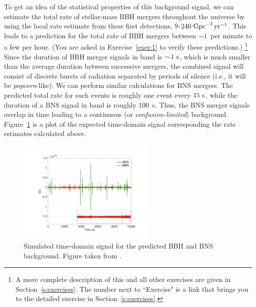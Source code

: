 To get an idea of the statistical properties of this
background signal, we can estimate the total rate of 
stellar-mass BBH mergers throughout the universe by
using the local rate estimate from these first detections,
$9$-$240~{\rm Gpc}^{-3}\,{\rm yr}^{-1}$.
This leads to a prediction for the total rate of 
BBH mergers between $\sim\!1$~per minute to a few per hour.
(You are asked in Exercise~\ref{exer:1} to verify
these predictions.)%
\footnote{A more complete description of this and 
all other exercises are given in 
Section~\ref{s:exercises}.
The number next to ``Exercise" is a link that brings 
you to the detailed exercise in Section~\ref{s:exercises}.}
Since the duration of BBH merger signals in band 
is $\sim\!1~{\rm s}$, which is much smaller than the 
average duration between successive mergers, the 
combined signal will consist of discrete bursts of 
radiation separated by periods of silence 
(i.e., it will be {\em popcorn}-like).
We can perform similar calculations for BNS mergers.
The predicted total rate for such events is roughly 
one event every $15~{\rm s}$, while the duration of 
a BNS signal in band is roughly 100~{\rm s}. 
Thus, the BNS merger signals overlap in time leading to 
a continuous (or {\em confusion-limited}) background.
Figure~\ref{f:BBH-BNS-timeseries} is a plot of the
expected time-domain signal corresponding the rate
estimates calculated above.
%
\begin{figure}[htbp!]
\begin{center}
\includegraphics[width=0.6\textwidth]{Figures/BBH-BNS-timeseries}
\caption{Simulated time-domain signal for the predicted BBH and 
BNS background.  
Figure taken from \cite{stoch-implications}.}
\label{f:BBH-BNS-timeseries}
\end{center}
\end{figure}
%

